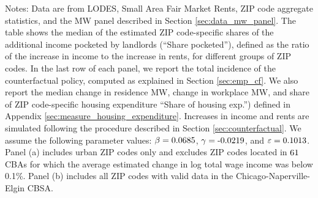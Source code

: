 \begin{table}[hbt!]
    \begin{minipage}{.95\textwidth} \footnotesize
        \vspace{4mm}
        Notes: 
        Data are from LODES, Small Area Fair Market Rents, ZIP code aggregate 
        statistics, and the MW panel described in Section \ref{sec:data_mw_panel}.
        The table shows the median of the estimated ZIP code-specific shares of 
        the additional income pocketed by landlords (``Share pocketed''), 
        defined as the ratio of the increase in income to the increase in rents,
        for different groups of ZIP codes.
        In the last row of each panel, we report the total incidence of the 
        counterfactual policy, computed as explained in Section \ref{sec:emp_cf}.
        We also report the median change in residence MW, change in workplace MW,
        and share of ZIP code-specific housing expenditure ``Share of housing 
        exp.'') defined in Appendix \ref{sec:measure_housing_expenditure}.
        Increases in income and rents are simulated following the procedure 
        described in Section \ref{sec:counterfactual}.
        We assume the following parameter values: 
        $\beta = \textnormal{0.0685}$, $\gamma = \textnormal{-0.0219}$, and $\varepsilon = \textnormal{0.1013}$.
        Panel (a) includes urban ZIP codes only and excludes ZIP codes located 
        in $\textnormal{61}$ CBAs for which the average estimated change in 
        log total wage income was below 0.1\%.
        Panel (b) includes all ZIP codes with valid data in the 
        Chicago-Naperville-Elgin CBSA.
    \end{minipage}
\end{table}


